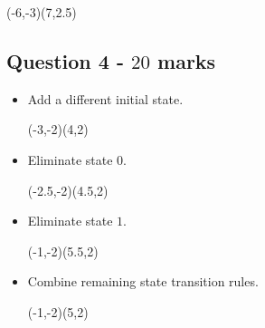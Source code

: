 \documentclass[12pt]{article}
\begin{document}
\begin{itemize}
\begin{center}
\begin{VCPicture}{(-6,-3)(7,2.5)}
%



\end{VCPicture}
\end{center}

\end{itemize}


\subsection*{Question 4 - $20$ marks}
\begin{itemize}
\item Add a different initial state.
\begin{center}
\begin{VCPicture}{(-3,-2)(4,2)}
\SmallState {}
%
\end{VCPicture}
\end{center}

\item Eliminate state $0$.
\begin{center}
\begin{VCPicture}{(-2.5,-2)(4.5,2)}
\SmallState {}
%
\end{VCPicture}
\end{center}

\item Eliminate state $1$.
\begin{center}
\begin{VCPicture}{(-1,-2)(5.5,2)}
\SmallState {}
%
\end{VCPicture}
\end{center}

\item Combine remaining state transition rules.
\begin{center}
\begin{VCPicture}{(-1,-2)(5,2)}
\SmallState {}
%
\end{VCPicture}
\end{center}
\end{itemize}
\end{document}
